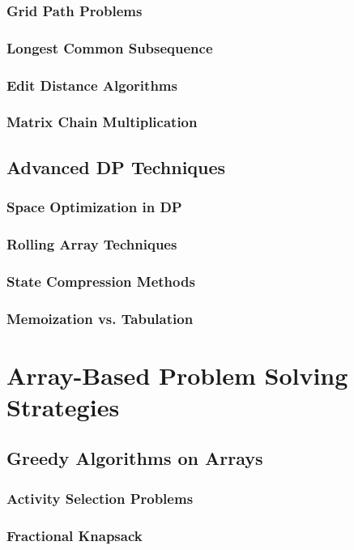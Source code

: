 \documentclass[12pt, oneside]{book}
\begin{document}
\subsubsection{Grid Path Problems}
\subsubsection{Longest Common Subsequence}
\subsubsection{Edit Distance Algorithms}
\subsubsection{Matrix Chain Multiplication}

\subsection{Advanced DP Techniques}
\subsubsection{Space Optimization in DP}
\subsubsection{Rolling Array Techniques}
\subsubsection{State Compression Methods}
\subsubsection{Memoization vs. Tabulation}

\section{Array-Based Problem Solving Strategies}
\subsection{Greedy Algorithms on Arrays}
\subsubsection{Activity Selection Problems}
\subsubsection{Fractional Knapsack}
\end{document}
